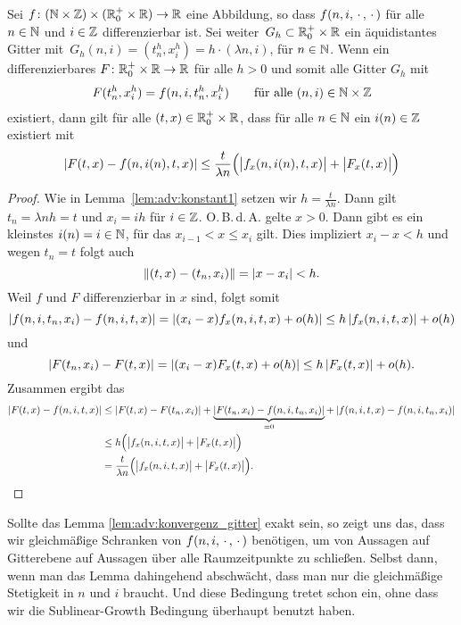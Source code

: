 \begin{lemma}\label{lem:adv:konvergenz_gitter}
Sei $f\colon (\mathbb N \times \mathbb Z) \times (\mathbb R^+_0 \times \mathbb R) \to \mathbb R$ eine Abbildung, so dass $f(n,i,\, \cdot \,,\, \cdot \,)$ für alle $n \in \mathbb N$ und $i \in \mathbb Z$ differenzierbar ist.
Sei weiter\, $G_h \subset \mathbb R^+_0 \times \mathbb R$ ein äquidistantes Gitter mit\, $G_h(n,i) = (t^h_n, x^h_i) = h \cdot (\lambda n, i)$, für $n \in \mathbb N$.
Wenn ein differenzierbares $F\colon \mathbb R^+_0 \times \mathbb R \to \mathbb R$ für alle $h > 0$ und somit alle Gitter $G_h$ mit
\begin{align}\label{eq:lemma:diag:voraussetzung}
F(t^h_n, x^h_i) = f(n, i, t^h_n, x^h_i) \qquad \text{für alle $(n,i) \in \mathbb N \times \mathbb Z$}
\end{align}
existiert, dann gilt für alle $(t, x) \in \mathbb R^+_0 \times \mathbb R$, dass für alle $n \in \mathbb N$ ein $i(n) \in \mathbb Z$ existiert mit
\begin{align}\label{eq:lemma:diag:aussage}
\left| F(t, x) - f(n, i(n), t, x) \right| \leq \frac {t}{\lambda n} \Bigl(\bigl\lvert f_x(n, i(n), t, x) \bigr\rvert + \bigl\lvert F_x(t, x) \bigr\rvert \Bigr)
\end{align}
\end{lemma}
\begin{proof}
Wie in Lemma~\ref{lem:adv:konstant1} setzen wir $h = \frac {t}{\lambda n}$.
Dann gilt $t_n = \lambda n h = t$ und $x_i = i h$ für $i \in \mathbb Z$.
O.\,B.\,d.\,A. gelte $x > 0$.
Dann gibt es ein kleinstes $i(n) = i \in \mathbb N$, für das $x_{i-1} < x \leq x_i$ gilt.
Dies impliziert $x_i - x < h$ und wegen $t_n = t$ folgt auch
\[ \left\lVert (t,x) - (t_n, x_i) \right\rVert = \left| x - x_i \right| < h. \]
Weil $f$ und $F$ differenzierbar in $x$ sind, folgt somit
\[ \left| f(n, i, t_n, x_i) - f(n, i, t, x) \right| = \left| (x_i - x) f_x(n, i, t, x) + o(h) \right| \leq h \left| f_x(n, i, t, x) \right| + o(h) \]
und
\[ \left| F(t_n, x_i) - F(t, x) \right| = \left| (x_i - x) F_x(t, x) + o(h) \right| \leq h \left| F_x(t, x) \right| + o(h). \]
Zusammen ergibt das
{\small
\begin{align*}
\left| F(t,x) - f(n, i, t, x) \right| &\leq \left| F(t, x) - F(t_n, x_i) \right| + \underbrace{\left| F(t_n, x_i) - f(n, i, t_n, x_i) \right|}_{= 0} + \left| f(n,i, t, x) - f(n, i, t_n, x_i) \right|\\
&\leq h \Bigl(\bigl\lvert f_x(n, i, t, x) \bigr\rvert + \bigl\lvert F_x(t, x) \bigr\rvert \Bigr)\\
&= \frac {t}{\lambda n} \Bigl(\bigl\lvert f_x(n, i, t, x) \bigr\rvert + \bigl\lvert F_x(t, x) \bigr\rvert \Bigr). \qedhere
\end{align*}
}
\end{proof}
Sollte das Lemma \ref{lem:adv:konvergenz_gitter} exakt sein, so zeigt uns das, dass wir gleichmäßige Schranken von $f(n, i, \, \cdot \,, \, \cdot \,)$ benötigen, um von Aussagen auf Gitterebene auf Aussagen über alle Raumzeitpunkte zu schließen.
Selbst dann, wenn man das Lemma dahingehend abschwächt, dass man nur die gleichmäßige Stetigkeit in $n$ und $i$ braucht.
Und diese Bedingung tretet schon ein, ohne dass wir die Sublinear-Growth Bedingung überhaupt benutzt haben.

